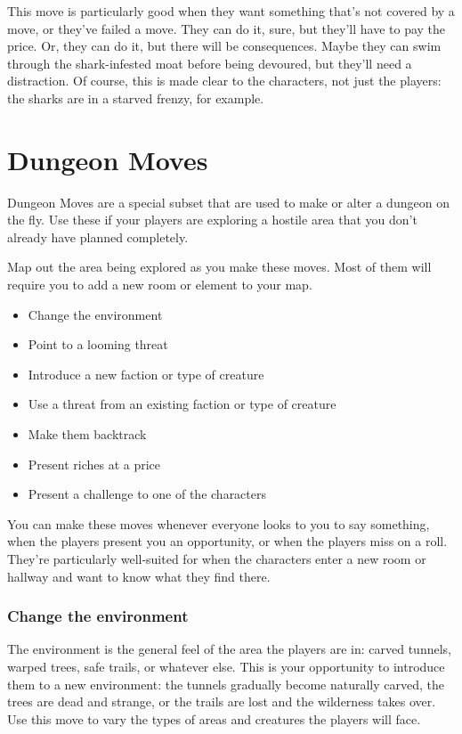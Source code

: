  This move is particularly good when they want something that's not covered by a move, or they've failed a move. They can do it, sure, but they'll have to pay the price. Or, they can do it, but there will be consequences. Maybe they can swim through the shark-infested moat before being devoured, but they'll need a distraction. Of course, this is made clear to the characters, not just the players: the sharks are in a starved frenzy, for example.
\section*{Dungeon Moves}


 Dungeon Moves are a special subset that are used to make or alter a dungeon on the fly. Use these if your players are exploring a hostile area that you don't already have planned completely.


 Map out the area being explored as you make these moves. Most of them will require you to add a new room or element to your map.
\begin{itemize}
\item Change the environment
\item Point to a looming threat
\item Introduce a new faction or type of creature
\item Use a threat from an existing faction or type of creature
\item Make them backtrack
\item Present riches at a price
\item Present a challenge to one of the characters

\end{itemize}


 You can make these moves whenever everyone looks to you to say something, when the players present you an opportunity, or when the players miss on a roll. They're particularly well-suited for when the characters enter a new room or hallway and want to know what they find there.
\subsubsection{Change the environment}


 The environment is the general feel of the area the players are in: carved tunnels, warped trees, safe trails, or whatever else. This is your opportunity to introduce them to a new environment: the tunnels gradually become naturally carved, the trees are dead and strange, or the trails are lost and the wilderness takes over. Use this move to vary the types of areas and creatures the players will face.
